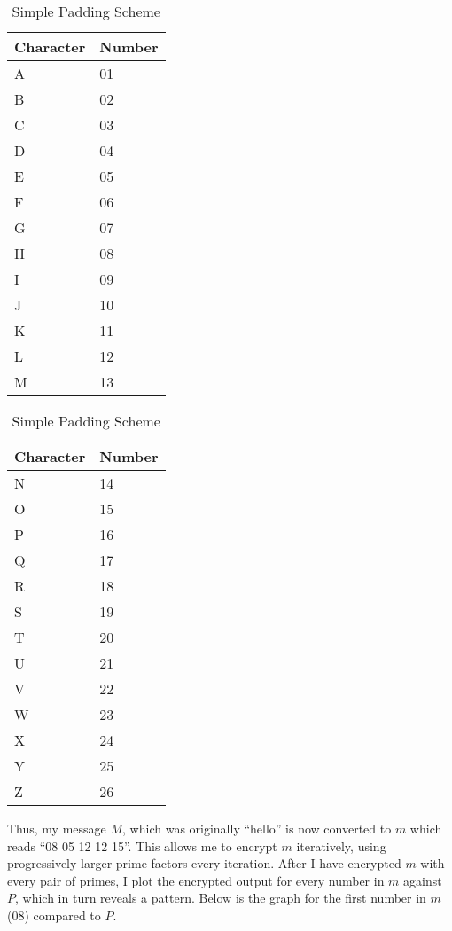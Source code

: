 \begin{table}[H]
    \centering
    \caption{Simple Padding Scheme}
   \begin{tabular}{ |p{3cm}|p{3cm}|  }
       \hline
       Character & Number\\
       \hline
       A  &  01 \\
       B  &  02 \\
       C  &  03 \\
       D  &  04 \\
       E  &  05 \\
       F  &  06 \\
       G  &  07 \\
       H  &  08 \\
       I  &  09 \\
       J  &  10 \\
       K  &  11 \\
       L  &  12 \\
       M  &  13 \\
       \hline
   \end{tabular}
   \begin{tabular}{ |p{3cm}|p{3cm}|  }
       \hline
       Character & Number\\
       \hline
       N  &  14 \\
       O  &  15 \\
       P  &  16 \\
       Q  &  17 \\
       R  &  18 \\
       S  &  19 \\
       T  &  20 \\
       U  &  21 \\
       V  &  22 \\
       W  &  23 \\
       X  &  24 \\
       Y  &  25 \\
       Z  &  26 \\
       \hline
   \end{tabular}
   \end{table}

Thus, my message $M$, which was originally “hello” is now converted to $m$ which reads “08 05 12 12 15”. This allows me to encrypt $m$ iteratively, using progressively larger prime factors every iteration. After I have encrypted $m$ with every pair of primes, I plot the encrypted output for every number in $m$ against $P$, which in turn reveals a pattern. Below is the graph for the first number in $m$ (08) compared to $P$.

